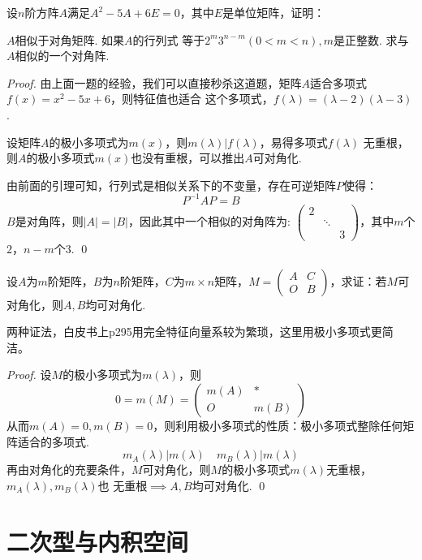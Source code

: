 \begin{ex}[ZJU 2007]
	设$n$阶方阵$A$满足$A^2-5A+6E=0$，其中$E$是单位矩阵，证明：

	\vspace{0.2cm}
	$A$相似于对角矩阵. 如果$A$的行列式
	等于$2^m3^{n-m} (0<m<n),m\text{是正整数}$. 求与$A$相似的一个对角阵.
\end{ex}

\begin{proof}
	由上面一题的经验，我们可以直接秒杀这道题，矩阵$A$适合多项式$f(x)=x^2-5x+6$，则特征值也适合
	这个多项式，$f(\lambda)=(\lambda-2)(\lambda - 3)$.

	设矩阵$A$的极小多项式为$m(x)$，则$m(\lambda) | f(\lambda)$，易得多项式$f(\lambda)$
	无重根，则$A$的极小多项式$m(x)$也没有重根，可以推出$A$可对角化.

	由前面的引理可知，行列式是相似关系下的不变量，存在可逆矩阵$P$使得：
	$$
		P^{-1} A P = B
	$$
	$B$是对角阵，则$|A|=|B|$，因此其中一个相似的对角阵为:
	$
	\begin{pmatrix}
		2 & & \\
		& \ddots & \\
		& & 3
	\end{pmatrix}
	$，其中$m$个$2$，$n-m$个$3$.
	\qed
\end{proof}

\begin{proposition}
	设$A$为$m$阶矩阵，$B$为$n$阶矩阵，$C$为$m \times n$矩阵，$M=\begin{pmatrix}
		A & C \\
		O & B
	\end{pmatrix}$，求证：若$M$可对角化，则$A,B$均可对角化.
\end{proposition}

两种证法，白皮书上p295用完全特征向量系较为繁琐，这里用极小多项式更简洁。

\begin{proof}
	设$M$的极小多项式为$m(\lambda)$，则
	$$
		0 = m(M) = \begin{pmatrix}
			m(A) & \ast \\
			O & m(B)
		\end{pmatrix} 
	$$
	从而$m(A)=0,m(B)=0$，则利用极小多项式的性质：极小多项式整除任何矩阵适合的多项式.
	$$
		m_A(\lambda) | m(\lambda)  \quad m_B(\lambda) | m(\lambda)
	$$
	再由对角化的充要条件，$M$可对角化，则$M$的极小多项式$m(\lambda)$无重根，$m_A(\lambda),m_B(\lambda)$也
	无重根$\implies A,B$均可对角化. \qed
\end{proof}

\chapter{二次型与内积空间}

